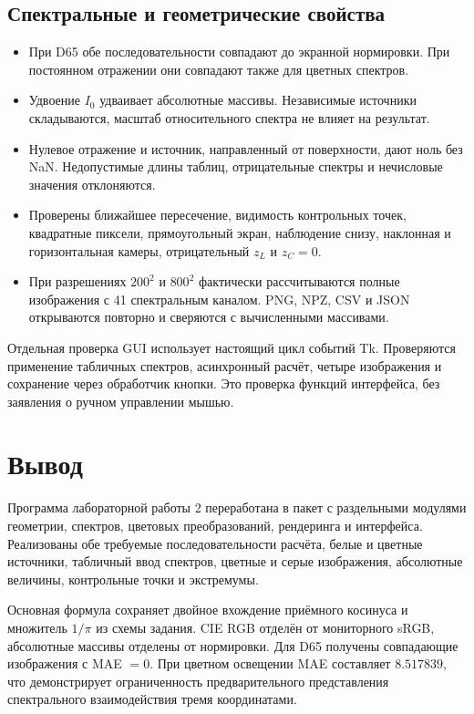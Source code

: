 \documentclass[a4paper,12pt]{article}
\begin{document}
\subsection{Спектральные и геометрические свойства}
\begin{itemize}
\item При D65 обе последовательности совпадают до экранной нормировки. При постоянном отражении они совпадают также для цветных спектров.
\item Удвоение $I_0$ удваивает абсолютные массивы. Независимые источники складываются, масштаб относительного спектра не влияет на результат.
\item Нулевое отражение и источник, направленный от поверхности, дают ноль без NaN. Недопустимые длины таблиц, отрицательные спектры и нечисловые значения отклоняются.
\item Проверены ближайшее пересечение, видимость контрольных точек, квадратные пиксели, прямоугольный экран, наблюдение снизу, наклонная и горизонтальная камеры, отрицательный $z_L$ и $z_C=0$.
\item При разрешениях $200^2$ и $800^2$ фактически рассчитываются полные изображения с 41 спектральным каналом. PNG, NPZ, CSV и JSON открываются повторно и сверяются с вычисленными массивами.
\end{itemize}

Отдельная проверка GUI использует настоящий цикл событий Tk. Проверяются применение табличных спектров, асинхронный расчёт, четыре изображения и сохранение через обработчик кнопки. Это проверка функций интерфейса, без заявления о ручном управлении мышью.

\clearpage
\section{Вывод}

Программа лабораторной работы 2 переработана в пакет с раздельными модулями геометрии, спектров, цветовых преобразований, рендеринга и интерфейса. Реализованы обе требуемые последовательности расчёта, белые и цветные источники, табличный ввод спектров, цветные и серые изображения, абсолютные величины, контрольные точки и экстремумы.

Основная формула сохраняет двойное вхождение приёмного косинуса и множитель $1/\pi$ из схемы задания. CIE RGB отделён от мониторного sRGB, абсолютные массивы отделены от нормировки. Для D65 получены совпадающие изображения с MAE $=0$. При цветном освещении MAE составляет $8.517839$, что демонстрирует ограниченность предварительного представления спектрального взаимодействия тремя координатами.
\end{document}
